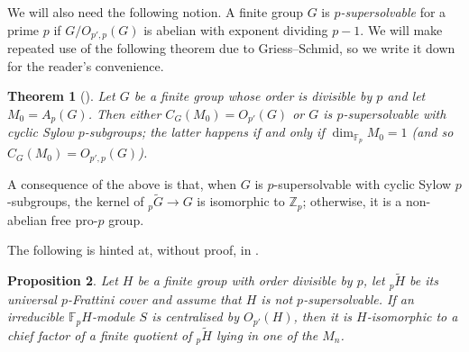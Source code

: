 \documentclass[a4paper,10pt]{amsart}
\theoremstyle{plain}
\newtheorem{thm}{Theorem}[section]
\newtheorem{proposition}[thm]{Proposition}
\theoremstyle{definition}
\begin{document}
We will also need the following notion. A finite group $G$ is \emph{$p$-supersolvable} for a prime $p$ if $G/O_{p',p}(G)$ is abelian with exponent dividing $p-1$. We will make repeated use of the following theorem due to Griess--Schmid, so we write it down for the reader's convenience.

\begin{thm}[{{\cite[Theorem 3]{GS78}}}]\label{t:cent_frattini}
    Let $G$ be a finite group whose order is divisible by $p$ and let $M_0=A_{p}(G)$. Then either $C_G(M_0) = O_{p'}(G)$ or $G$ is $p$-supersolvable with cyclic Sylow $p$-subgroups; the latter happens if and only if $\dim_{\mathbb F_p}M_0=1$ (and so $C_G(M_0)=O_{p',p}(G)$).
\end{thm}

A consequence of the above is that, when $G$ is $p$-supersolvable with cyclic Sylow $p$-subgroups, the kernel of ${}_p\widetilde G \to G$ is isomorphic to $\mathbb Z_p$; otherwise, it is a non-abelian free pro-$p$ group.

The following is hinted at, without proof, in \cite{CKK}.

\begin{proposition}\label{p:comp_factor}
    Let $H$ be a finite group with order divisible by $p$, let $_p \widetilde H$ be its universal $p$-Frattini cover and assume that $H$ is not $p$-supersolvable. If an irreducible $\mathbb F_pH$-module $S$ is centralised by $O_{p'}(H)$, then it is $H$-isomorphic to a chief factor of a finite quotient of $_p \widetilde H$ lying in one of the $M_n$.
\end{proposition}
\end{document}
